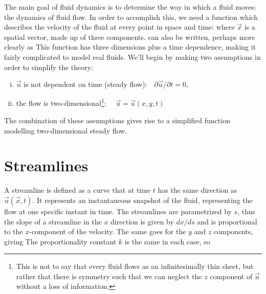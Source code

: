 \documentclass[12pt]{book}
\begin{document}
The main goal of fluid dynamics is to determine the way in which a fluid moves: the dynamics of fluid flow.  In order to accomplish this, we need a function which describes the velocity of the fluid at every point in space and time:
where $\vec x$ is a spatial vector, made up of three components.  can also be written, perhaps more clearly as 
This function has three dimensions plus a time dependence, making it fairly complicated to model real fluids.  We'll begin by making two assumptions in order to simplify the theory:
\begin{enumerate}[i. ]
\item{$\vec u$ is not dependent on time (steady flow):\ \  $\partial \vec u / \partial t = 0$,}
\item{the flow is two-dimensional\footnote{This is not to say that every fluid flows as an infinitesimally thin sheet, but rather that there is symmetry such that we can neglect the $z$ component of $\vec u$ without a loss of information.}: \ \ $\vec u = \vec u (x,y,t)$}
\end{enumerate}
The combination of these assumptions gives rise to a simplified function 
 modelling two-dimensional steady flow.



\section{Streamlines}
A streamline is defined as a curve that at time $t$ has the same direction as $\vec u (\vec x,t)$.  It represents an instantaneous snapshot of the fluid, representing the flow at one specific instant in time. The streamlines are parametrized by $s$, thus the slope of a streamline in the $x$ direction is given by $d x/d s$ and is proportional to the $x$-component of the velocity.  The same goes for the $y$ and $z$ components, giving
The proportionality constant $k$ is the same in each case, so 
\end{document}
